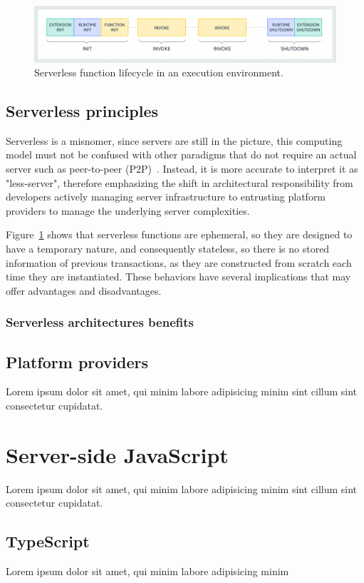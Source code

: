 \begin{figure}[H]
  \centering
  \includegraphics[width=\textwidth]{diagrams/lambda.png}
  \caption{Serverless function lifecycle in an execution environment.}
  \label{fig:serverless-functions-lifecycle}
\end{figure}

\subsection{Serverless principles}

Serverless is a misnomer, since servers are still in the picture,
this computing model must not be confused with other paradigms
that do not require an actual server such as peer-to-peer (P2P)~\cite{serverless-wikipedia}.
Instead, it is more accurate to interpret it as "less-server",
therefore emphasizing the shift in architectural responsibility from developers actively
managing server infrastructure to entrusting platform providers to manage the underlying server complexities.

Figure~\ref{fig:serverless-functions-lifecycle} shows that serverless functions
are ephemeral, so they are designed to have a temporary nature, and consequently
stateless, so there is no stored information of previous transactions, as they are constructed
from scratch each time they are instantiated.
These behaviors have several implications that may offer advantages and disadvantages.

\subsubsection{Serverless architectures benefits}

\subsection{Platform providers}

Lorem ipsum dolor sit amet, qui minim labore adipisicing minim sint cillum sint consectetur cupidatat.

\section{Server-side JavaScript}

Lorem ipsum dolor sit amet, qui minim labore adipisicing minim sint cillum sint consectetur cupidatat.

\subsection{TypeScript}

Lorem ipsum dolor sit amet, qui minim labore adipisicing minim
